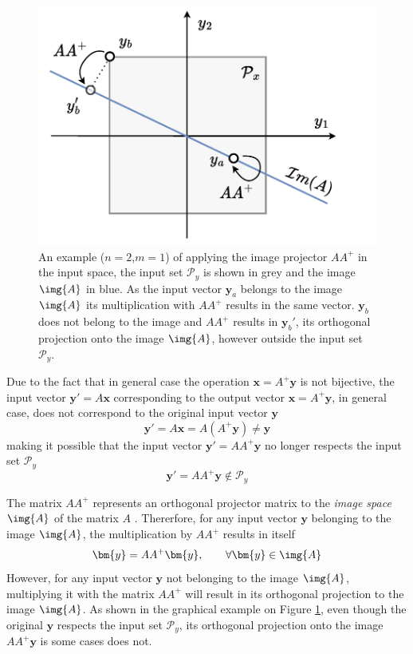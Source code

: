\begin{figure}
    \centering
    \includegraphics[width=\linewidth]{Chapters/imgs/img_pseudo_prob.pdf}
    \caption{An example ($n=2$,$m=1$) of applying the image projector $AA^+$ in the input space, the input set $\mathcal{P}_y$ is shown in grey and the image $\img{A}$ in blue. As the input vector $\bm{y}_a$ belongs to the image $\img{A}$ its multiplication with $AA^+$ results in the same vector. $\bm{y}_b$  does not belong to the image and $AA^+$ results in $\bm{y}_b'$, its orthogonal projection onto the image $\img{A}$, however outside the input set $\mathcal{P}_y$.}
    \label{fig:image_psueodinverse_ilustration}
\end{figure}
Due to the fact that in general case the operation $\bm{x}=A^+\bm{y}$ is not bijective, the input vector $\bm{y}'=A\bm{x}$ corresponding to the output vector $\bm{x}=A^+\bm{y}$, in general case, does not correspond to the original input vector $\bm{y}$ 
\begin{equation}
\bm{y}' = A\bm{x} = A(A^+\bm{y})\neq\bm{y}
\end{equation}
making it possible that the input vector $\bm{y}'=AA^+\bm{y}$ no longer respects the input set $\mathcal{P}_y$
\begin{equation}
    \bm{y}'=AA^+\bm{y}\notin\mathcal{P}_y
\end{equation}

The matrix $AA^+$ represents an orthogonal projector matrix to the \textit{image space} $\img{A}$ of the matrix $A$ \cite[Chapter 5.5.4]{golub1996matrix}. Thererfore, for any input vector $\bm{y}$ belonging to the image $\img{A}$, the multiplication by $AA^+$ results in itself \cite[Chapeter 1.3.1]{wang2018generalized}
\begin{equation}
    \bm{y} = AA^+\bm{y}, \qquad \forall \bm{y}\in\img{A}
\end{equation}
However, for any input vector $\bm{y}$ not belonging to the image $\img{A}$, multiplying it with the matrix $AA^+$ will result in its orthogonal projection to the image $\img{A}$. As shown in the graphical example on Figure \ref{fig:image_psueodinverse_ilustration}, even though the original $\bm{y}$ respects the input set $\mathcal{P}_y$, its orthogonal projection onto the image $AA^+\bm{y}$ is some cases does not.

